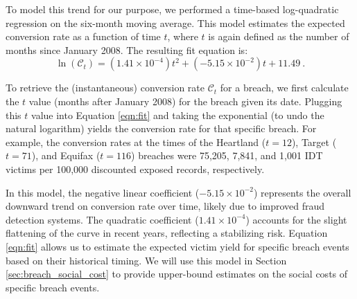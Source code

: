 
To model this trend for our purpose, %
we performed a time-based log-quadratic regression on the six-month moving average. This model estimates the expected conversion rate as a function of time $t$, where $t$ is again defined as the number of months since January 2008. The resulting fit equation is:
\begin{equation}
\label{eqn:fit}
    \ln(\mathcal{C}_t) = (1.41 \times10^{-4})t^2 + (-5.15 \times 10^{-2})t + 11.49~. 
\end{equation}

To retrieve the (instantaneous) conversion rate $\mathcal{C}_t$ for a breach, we first calculate the $t$ value (months after January 2008) for the breach given its date. Plugging this $t$ value into Equation \ref{eqn:fit} and taking the exponential (to undo the natural logarithm) yields the conversion rate for that specific breach. For example, the conversion rates at the times of the Heartland  ($t=12$), Target ($t=71$), and Equifax ($t=116$) breaches were 75,205, 7,841, and 1,001 IDT victims per 100,000 discounted exposed records, respectively.

In this model, the negative linear coefficient ($-5.15 \times 10^{-2}$) represents the overall downward trend on conversion rate over time, likely due to improved fraud detection systems. The quadratic coefficient ($1.41 \times10^{-4}$) accounts for the slight flattening of the curve in recent years, reflecting a stabilizing risk. Equation \ref{eqn:fit} allows us to estimate the expected victim yield for specific breach events based on their historical timing. We will use this model in Section \ref{sec:breach_social_cost} to provide upper-bound estimates on the social costs of specific breach events. 


